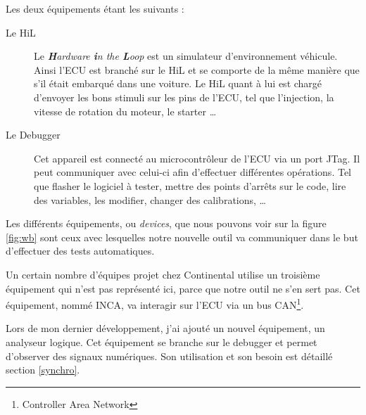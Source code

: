 		Les deux équipements étant les suivants : 
		\begin{description}
			\item[Le HiL] Le \textit{\textbf{H}ardware \textbf{i}n the \textbf{L}oop} est un simulateur d'environnement véhicule. Ainsi l'ECU est branché sur le HiL et se comporte de la même manière que s'il était embarqué dans une voiture. Le HiL quant à lui est chargé d'envoyer les bons stimuli sur les pins de l'ECU, tel que l'injection, la vitesse de rotation du moteur, le starter \ldots
			\item[Le Debugger] Cet {appareil} est connecté au microcontrôleur de l'ECU via un port JTag. Il peut communiquer avec celui-ci afin d'effectuer différentes opérations. Tel que flasher le logiciel à tester, mettre des points d'arrêts sur le code, lire des variables, les modifier, changer des calibrations, \ldots
		\end{description}
		Les différents équipements, ou \textit{devices}, que nous pouvons voir sur la figure \ref{fig:wb} sont ceux avec lesquelles notre nouvelle outil va communiquer dans le but d'effectuer des tests automatiques. 		
		
					\begin{remarque}
					Un certain nombre d'équipes projet chez Continental utilise un troisième équipement qui n'est pas représenté ici, parce que notre outil ne s'en sert pas. Cet équipement, nommé INCA, va interagir sur l'ECU via un bus CAN\footnote{Controller Area Network}.
					
					Lors de mon dernier développement, j'ai ajouté un nouvel équipement, un analyseur logique. Cet équipement se branche sur le debugger et permet d'observer des signaux numériques. Son utilisation et son besoin est détaillé section \ref{synchro}.
				\end{remarque}


